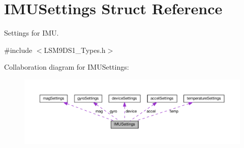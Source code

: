 \hypertarget{structIMUSettings}{}\section{I\+M\+U\+Settings Struct Reference}
\label{structIMUSettings}


Settings for I\+MU.  




{\ttfamily \#include $<$L\+S\+M9\+D\+S1\+\_\+\+Types.\+h$>$}



Collaboration diagram for I\+M\+U\+Settings\+:
\nopagebreak
\begin{figure}[H]
\begin{center}
\leavevmode
\includegraphics[width=350pt]{structIMUSettings__coll__graph}
\end{center}
\end{figure}

